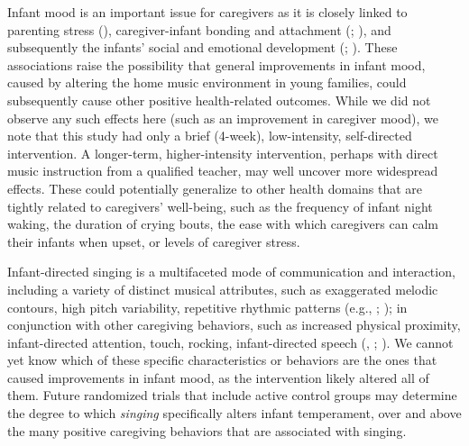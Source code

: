 \documentclass[
]{article}
\begin{document}
Infant mood is an important issue for caregivers as it is closely linked
to parenting stress (),
caregiver-infant bonding and attachment (; ), and
subsequently the infants' social and emotional development
(;
). These associations raise
the possibility that general improvements in infant mood, caused by
altering the home music environment in young families, could
subsequently cause other positive health-related outcomes. While we did
not observe any such effects here (such as an improvement in caregiver
mood), we note that this study had only a brief (4-week), low-intensity,
self-directed intervention. A longer-term, higher-intensity
intervention, perhaps with direct music instruction from a qualified
teacher, may well uncover more widespread effects. These could
potentially generalize to other health domains that are tightly related
to caregivers' well-being, such as the frequency of infant night waking,
the duration of crying bouts, the ease with which caregivers can calm
their infants when upset, or levels of caregiver stress.

Infant-directed singing is a multifaceted mode of communication and
interaction, including a variety of distinct musical attributes, such as
exaggerated melodic contours, high pitch variability, repetitive
rhythmic patterns (e.g., ; ); in
conjunction with other caregiving behaviors, such as increased physical
proximity, infant-directed attention, touch, rocking, infant-directed
speech (,
; ). We cannot yet know which of these specific
characteristics or behaviors are the ones that caused improvements in
infant mood, as the intervention likely altered all of them. Future
randomized trials that include active control groups may determine the
degree to which \emph{singing} specifically alters infant temperament,
over and above the many positive caregiving behaviors that are
associated with singing.
\end{document}
